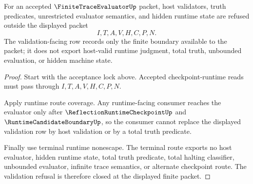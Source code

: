 \begin{theorem}
\label{thm:finite-trace-evaluator-validation-refusal-closure}
For an accepted $\FiniteTraceEvaluatorUp$ packet, host validators, truth predicates, unrestricted evaluator semantics, and hidden runtime state are refused outside the displayed packet
$$
I,T,A,V,H,C,P,N.
$$
The validation-facing row records only the finite boundary available to the packet; it does not export host-valid runtime judgment, total truth, unbounded evaluation, or hidden machine state.
\end{theorem}
\begin{proof}
Start with the acceptance lock above. Accepted checkpoint-runtime reads must pass through $I,T,A,V,H,C,P,N$.

Apply runtime route coverage. Any runtime-facing consumer reaches the evaluator only after $\ReflectionRuntimeCheckpointUp$ and $\RuntimeCandidateBoundaryUp$, so the consumer cannot replace the displayed validation row by host validation or by a total truth predicate.

Finally use terminal runtime nonescape. The terminal route exports no host evaluator, hidden runtime state, total truth predicate, total halting classifier, unbounded evaluator, infinite trace semantics, or alternate checkpoint route. The validation refusal is therefore closed at the displayed finite packet.
\end{proof}
